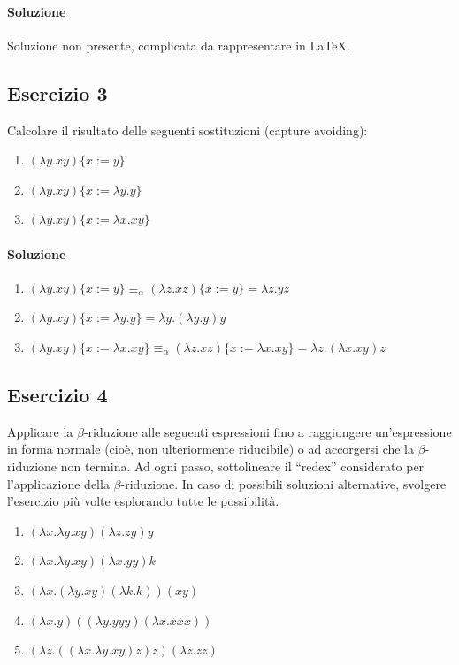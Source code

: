\documentclass[12pt,a4paper]{article}
\begin{document}
\paragraph{Soluzione}
Soluzione non presente, complicata da rappresentare in LaTeX.
\subsection{Esercizio 3}
Calcolare il risultato delle seguenti sostituzioni (capture avoiding):
\begin{enumerate}
    \item
    $(\lambda y.xy)\{x := y\}$

    \item
    $(\lambda y.xy)\{x := \lambda y.y\}$

    \item
    $(\lambda y.xy)\{x := \lambda x.xy\}$
\end{enumerate}
\paragraph{Soluzione}
\begin{enumerate}
    \item
    $(\lambda y.xy)\{x := y\} \equiv_\alpha (\lambda z.xz)\{x := y\} = \lambda z.yz$

    \item
    $(\lambda y.xy)\{x := \lambda y.y\} = \lambda y.(\lambda y.y)y$

    \item
    $(\lambda y.xy)\{x := \lambda x.xy\} \equiv_\alpha (\lambda z.xz)\{x := \lambda x.xy\} = \lambda z.(\lambda x.xy)z$
\end{enumerate}
\subsection{Esercizio 4}
Applicare la $\beta$-riduzione alle seguenti espressioni fino a raggiungere un'espressione in forma normale (cioè, non ulteriormente riducibile) o ad accorgersi che la $\beta$-riduzione non termina. Ad ogni passo, sottolineare il ``redex'' considerato per l'applicazione della $\beta$-riduzione. In caso di possibili soluzioni alternative, svolgere l'esercizio più volte esplorando tutte le possibilità.
\begin{enumerate}
    \item
    $(\lambda x.\lambda y.xy)(\lambda z.zy)y$

    \item
    $(\lambda x.\lambda y.xy)(\lambda x.yy)k$

    \item
    $(\lambda x.(\lambda y.xy)(\lambda k.k))(xy)$

    \item
    $(\lambda x.y)((\lambda y.yyy)(\lambda x.xxx))$

    \item
    $(\lambda z.((\lambda x.\lambda y.xy)z)z)(\lambda z.zz)$
\end{enumerate}
\end{document}
